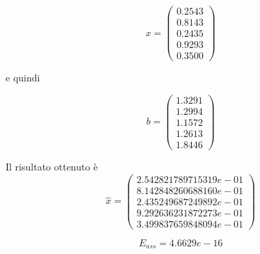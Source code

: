 \[
x = \begin{pmatrix}
0.2543\\
0.8143\\
0.2435\\
0.9293\\
0.3500
\end{pmatrix}
\]

e quindi

\[
b = \begin{pmatrix}
1.3291\\
1.2994\\
1.1572\\
1.2613\\
1.8446
\end{pmatrix}
\]

Il risultato ottenuto è
\[
\hat{x} = \begin{pmatrix}
2.542821789715319e-01\\
8.142848260688160e-01\\
2.435249687249892e-01\\
9.292636231872273e-01\\
3.499837659848094e-01
\end{pmatrix}
\]

\[
E_{ass} = 4.6629e-16
\]